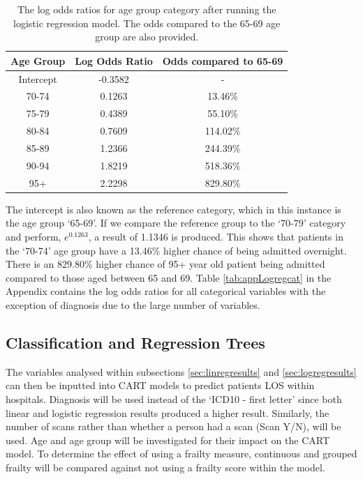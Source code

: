 \documentclass[../thesis.tex]{subfiles}
\begin{document}
\begin{table}[h!]
    \centering
    \begin{tabular}{ccc}\toprule
    \textbf{Age Group} & \textbf{Log Odds Ratio} &\textbf{Odds compared to 65-69} \\ \midrule
       Intercept  & -0.3582 & -\\
       70-74 & 0.1263 & 13.46\%\\
       75-79 & 0.4389 & 55.10\%\\
       80-84 & 0.7609 &114.02\%\\
       85-89 & 1.2366 & 244.39\%\\
       90-94 & 1.8219& 518.36\%\\
       95+ & 2.2298& 829.80\%\\ \bottomrule
    \end{tabular}
    \caption{The log odds ratios for age group category after running the logistic regression model. The odds compared to the 65-69 age group are also provided.}
    \label{tab:logisticregcat}
\end{table}
The intercept is also known as the reference category, which in this instance is the age group `65-69'. If we compare the reference group to the `70-79' category and perform, $e^{0.1263}$, a result of 1.1346 is produced. This shows that patients in the `70-74' age group have a 13.46\% higher chance of being admitted overnight. There is an 829.80\% higher chance of 95+ year old patient being admitted compared to those aged between 65 and 69. Table \ref{tab:appLogregcat} in the Appendix contains the log odds ratios for all categorical variables with the exception of diagnosis due to the large number of variables.

\subsection{Classification and Regression Trees}
The variables analysed within subsections \ref{sec:linregresults} and \ref{sec:logregresults} can then be inputted into CART models to predict patients LOS within hospitals. Diagnosis will be used instead of the `ICD10 - first letter' since both linear and logistic regression results produced a higher result. Similarly, the number of scans rather than whether a person had a scan (Scan Y/N), will be used. Age and age group will be investigated for their impact on the CART model. To determine the effect of using a frailty measure, continuous and grouped frailty will be compared against not using a frailty score within the model.
\end{document}
